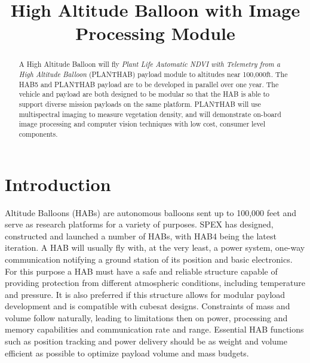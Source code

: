 \documentclass[conference]{IEEEtran} %
\title{High Altitude Balloon with Image Processing Module}
\author{
  \IEEEauthorblockN{%
    Keshav~Adhyay\IEEEauthorrefmark{1}
    Philip~Linden\IEEEauthorrefmark{2}
  }
  \IEEEauthorblockA{%
    RIT Space Exploration, Rochester Institute of Technology \\ %
    Rochester, N.Y. \\
    Email:
    \IEEEauthorrefmark{1}keshavadhyay@gmail.com
    \IEEEauthorrefmark{2}pjl7651@rit.edu
  }

}
\begin{document}
\maketitle%

\begin{abstract}
  A High Altitude Balloon will fly \textit{Plant Life Automatic NDVI with Telemetry from a High Altitude Balloon} (PLANTHAB) payload module to altitudes near 100,000ft.
  The HAB5 and PLANTHAB payload are to be developed in parallel over one year.
  The vehicle and payload are both designed to be modular so that the HAB is able to support diverse mission payloads on the same platform.
  PLANTHAB will use multispectral imaging to measure vegetation density, and will demonstrate on-board image processing and computer vision techniques with low cost, consumer level components.

\end{abstract}

\section{Introduction}
 Altitude Balloons (HABs) are autonomous balloons sent up to 100,000 feet and serve as research platforms for a variety of purposes.
SPEX has designed, constructed and launched a number of HABs, with HAB4 being the latest iteration.
A HAB will usually fly with, at the very least, a power system, one-way communication notifying a ground station of its position and basic electronics.
For this purpose a HAB must have a safe and reliable structure capable of providing protection from different atmospheric conditions, including temperature and pressure.
It is also preferred if this structure allows for modular payload development and is compatible with cubesat designs.
Constraints of mass and volume follow naturally, leading to limitations then on power, processing and memory capabilities and communication rate and range.
Essential HAB functions such as position tracking and power delivery should be as weight and volume efficient as possible to optimize payload volume and mass budgets.
\end{document}
